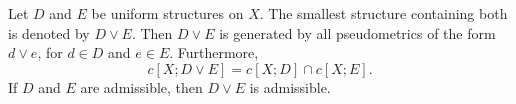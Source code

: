 Let $D$ and $E$ be uniform structures on $X$. The smallest structure containing both is denoted by $D \vee E$. Then $D \vee E$ is generated by all pseudometrics of the form $d \vee e$, for $d \in D$ and $e \in E$. Furthermore,
$$c[X; D \vee E] = c[X; D] \cap c[X; E].$$
If $D$ and $E$ are admissible, then $D \vee E$ is admissible.
